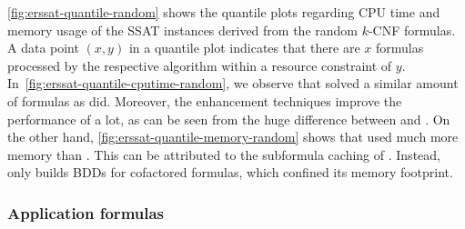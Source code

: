 \cref{fig:erssat-quantile-random} shows the quantile plots regarding CPU time and memory usage
of the SSAT instances derived from the random $k$-CNF formulas.
A data point $(x,y)$ in a quantile plot indicates that
there are $x$ formulas processed by the respective algorithm within a resource constraint of $y$.
In~\cref{fig:erssat-quantile-cputime-random},
we observe that \erssat solved a similar amount of formulas as \dcssat did.
Moreover, the enhancement techniques improve the performance of \erssat a lot,
as can be seen from the huge difference between \erssat and \erssatb.
On the other hand,
\cref{fig:erssat-quantile-memory-random} shows that \dcssat used much more memory than \erssat.
This can be attributed to the subformula caching of \dcssat.
Instead, \erssat only builds BDDs for cofactored formulas, which confined its memory footprint.

\subsubsection{Application formulas}

